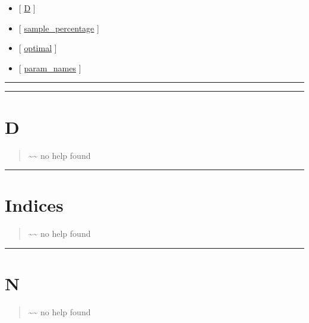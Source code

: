 \documentclass[letterpaper,10pt,english]{sphinxmanual}
\begin{document}
\begin{itemize}
\item {} 
{[} {\hyperref[classes/utils/@hdmr/hdmr:d]{D}} {]}

\item {} 
{[} {\hyperref[classes/utils/@hdmr/hdmr:sample-percentage]{sample\_percentage}} {]}

\item {} 
{[} {\hyperref[classes/utils/@hdmr/hdmr:optimal]{optimal}} {]}

\item {} 
{[} {\hyperref[classes/utils/@hdmr/hdmr:param-names]{param\_names}} {]}

\end{itemize}


\bigskip\hrule{}\bigskip



\bigskip\hrule{}\bigskip



\section{D}
\label{classes/utils/@hdmr/hdmr:d}\label{classes/utils/@hdmr/hdmr:id1}\begin{quote}

\textasciitilde{}\textasciitilde{} no help found
\end{quote}


\bigskip\hrule{}\bigskip



\section{Indices}
\label{classes/utils/@hdmr/hdmr:indices}\label{classes/utils/@hdmr/hdmr:id2}\begin{quote}

\textasciitilde{}\textasciitilde{} no help found
\end{quote}


\bigskip\hrule{}\bigskip



\section{N}
\label{classes/utils/@hdmr/hdmr:id3}\label{classes/utils/@hdmr/hdmr:n}\begin{quote}

\textasciitilde{}\textasciitilde{} no help found
\end{quote}
\end{document}
